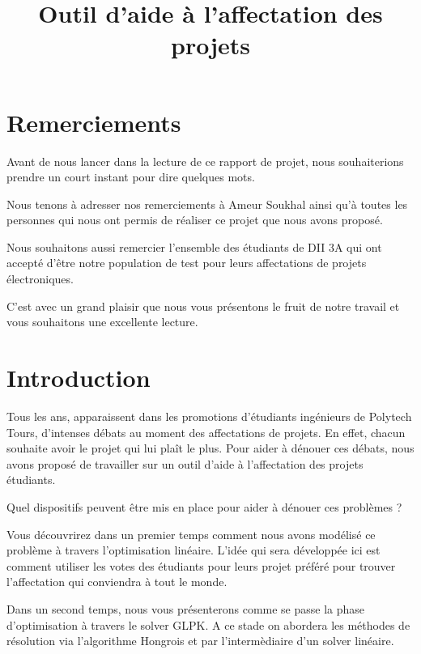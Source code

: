 \documentclass[final,poster]{polytech/polytech}
\title{Outil d'aide à l'affectation des projets}
\begin{document}

\chapter*{Remerciements}

Avant de nous lancer dans la lecture de ce rapport de projet, nous souhaiterions prendre un court instant pour dire quelques mots.

Nous tenons à adresser nos remerciements à Ameur Soukhal ainsi qu'à toutes les personnes qui nous ont permis de réaliser ce projet que nous avons proposé.

Nous souhaitons aussi remercier l'ensemble des étudiants de DII 3A qui ont accepté d'être notre population de test pour leurs affectations de projets électroniques. 

C'est avec un grand plaisir que nous vous présentons le fruit de notre travail et vous souhaitons une excellente lecture.

\chapter*{Introduction\label{chap:intro}}


Tous les ans, 	apparaissent dans les promotions d'étudiants ingénieurs de Polytech Tours, d'intenses débats au moment des affectations de projets. 
En effet, chacun souhaite avoir le projet qui lui plaît le plus. Pour aider à dénouer ces débats, nous avons proposé de travailler sur un outil d'aide à l'affectation des projets étudiants. 

Quel dispositifs peuvent être mis en place pour aider à dénouer ces problèmes ?



Vous découvrirez dans un premier temps comment nous avons modélisé ce problème à travers l'optimisation linéaire. L'idée qui sera développée ici est comment utiliser les votes des étudiants pour leurs projet préféré pour trouver l'affectation qui conviendra à tout le monde.

Dans un second temps, nous vous présenterons comme se passe la phase d'optimisation à travers le solver GLPK. A ce stade on abordera les méthodes de résolution via l'algorithme Hongrois et par l'intermèdiaire d'un solver linéaire.
\end{document}
